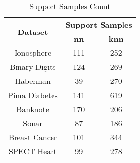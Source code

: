 \begin{table}[htbp]
\caption{Support Samples Count}
\begin{center}
\begin{tabular}{|c|c|c|}
\hline
\multirow{2}{*}{\textbf{Dataset}} & \multicolumn{2}{c|}{\textbf{Support Samples}} \\ \cline{2-3}
 & \textbf{nn} & \textbf{knn} \\ \hline
Ionosphere & 111 & 252 \\ \hline
Binary Digits & 124 & 269 \\ \hline
Haberman & 39 & 270 \\ \hline
Pima Diabetes & 141 & 619 \\ \hline
Banknote & 170 & 206 \\ \hline
Sonar & 87 & 186 \\ \hline
Breast Cancer & 101 & 344 \\ \hline
SPECT Heart & 99 & 278 \\ \hline
\end{tabular}
\label{tab:support}
\end{center}
\end{table}